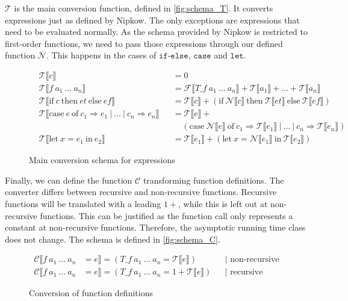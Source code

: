 $\mathcal{T}$ is the main conversion function, defined in \autoref{fig:schema_T}.
It converts expressions just as defined by Nipkow.
The only exceptions are expressions that need to be evaluated normally.
As the schema provided by Nipkow is restricted to first-order functions, we need to pass those expressions through our defined function $\mathcal{N}$.
This happens in the cases of $\texttt{if-else}$, $\texttt{case}$ and $\texttt{let}$.
\begin{figure}
\begin{align*}
  &\mathcal{T}\llbracket c\rrbracket &&= 0\\
  &\mathcal{T}\llbracket f\ a_{1}\ \dots\ a_{n}\rrbracket &&= \mathcal{F}\llbracket T\_f\ a_{1}\ \dots\ a_{n}\rrbracket + \mathcal{T}\llbracket a_{1}\rrbracket + \dots + \mathcal{T}\llbracket a_{n}\rrbracket\\
  &\mathcal{T}\llbracket \text{if}\ c\ \text{then}\ et\ \text{else}\ ef\rrbracket &&= \mathcal{T}\llbracket c\rrbracket + (\text{if}\ \mathcal{N}\llbracket c\rrbracket\ \text{then}\ \mathcal{T}\llbracket et\rrbracket\ \text{else}\ \mathcal{T}\llbracket ef\rrbracket)\\
  &\mathcal{T}\llbracket \text{case}\ e\ \text{of}\ c_{1} \Rightarrow e_{1}\ |\ \dots\ |\ c_{n}\Rightarrow e_{n}\rrbracket &&= \mathcal{T}\llbracket e\rrbracket + \\
  & &&\ \ \ \ \ (\text{case}\ \mathcal{N}\llbracket e\rrbracket\ \text{of}\ c_{1}\Rightarrow\mathcal{T}\llbracket e_{1}\rrbracket\ |\ \dots\ |\ c_{n} \Rightarrow \mathcal{T}\llbracket e_{n}\rrbracket)\\
  &\mathcal{T}\llbracket \text{let}\ x = e_{1}\ \text{in}\ e_{2}\rrbracket &&= \mathcal{T}\llbracket e_{1}\rrbracket + (\text{let}\ x = \mathcal{N}\llbracket e_{1}\rrbracket\ \text{in}\ \mathcal{T}\llbracket e_{2}\rrbracket)
\end{align*}
  \caption{Main conversion schema for expressions}
  \label{fig:schema_T}
\end{figure}

Finally, we can define the function $\mathcal{C}$ transforming function definitions.
The converter differs between recursive and non-recursive functions.
Recursive functions will be translated with a leading $1+$, while this is left out at non-recursive functions.
This can be justified as the function call only represents a constant at non-recursive functions.
Therefore, the asymptotic running time class does not change.
The schema is defined in \autoref{fig:schema_C}.

\begin{figure}
  \begin{align*}
    \mathcal{C}\llbracket f\ a_1\ \dots\ a_n &= e\rrbracket = (T\_f\ a_{1}\ \dots\ a_{n} = \mathcal{T}\llbracket e\rrbracket) &&\text{| non-recursive}\\
    \mathcal{C}\llbracket f\ a_1\ \dots\ a_n &= e\rrbracket = (T\_f\ a_{1}\ \dots\ a_{n} = 1 + \mathcal{T}\llbracket e\rrbracket) &&\text{| recursive}
  \end{align*}
  \caption{Conversion of function definitions}
  \label{fig:schema_C}
\end{figure}
